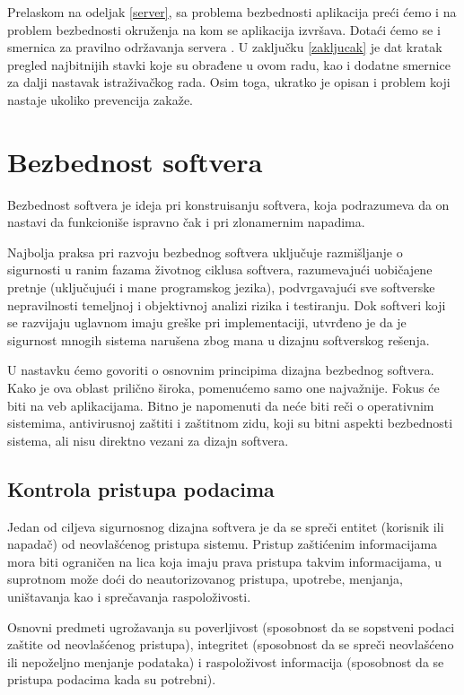 \documentclass[a4paper]{article}
\begin{document}
Prelaskom na odeljak \ref{server}, sa problema bezbednosti aplikacija preći ćemo i na problem bezbednosti okruženja na kom se aplikacija izvršava. Dotaći ćemo se i smernica za pravilno održavanja servera \cite{WS}. U zaklju\v{c}ku \ref{zakljucak} je dat kratak pregled najbitnijih stavki koje su obrađene u ovom radu, kao i dodatne smernice za dalji nastavak istraživačkog rada. Osim toga, ukratko je opisan i problem koji nastaje ukoliko prevencija zakaže.

\section{Bezbednost softvera} \label{bezbednost}

Bezbednost softvera je ideja pri konstruisanju softvera, koja podrazumeva da on nastavi da funkcioniše ispravno čak i pri zlonamernim napadima.

Najbolja praksa pri razvoju bezbednog softvera uključuje razmišljanje o sigurnosti u ranim fazama životnog ciklusa softvera, razumevajući uobičajene pretnje (uključujući i mane programskog jezika), podvrgavajući sve softverske nepravilnosti temeljnoj i objektivnoj analizi rizika i testiranju. Dok softveri koji se razvijaju uglavnom imaju greške pri implementaciji, utvrđeno je da je sigurnost mnogih sistema narušena zbog mana u dizajnu softverskog rešenja.

U nastavku ćemo govoriti o osnovnim principima dizajna bezbednog softvera. Kako je ova oblast prilično široka, pomenućemo samo one najvažnije. Fokus će biti na veb aplikacijama. Bitno je napomenuti da neće biti reči o operativnim sistemima, antivirusnoj zaštiti i zaštitnom zidu, koji su bitni aspekti bezbednosti sistema, ali nisu direktno vezani za dizajn softvera.

\subsection{Kontrola pristupa podacima}
Jedan od ciljeva sigurnosnog dizajna softvera je da se spreči entitet (korisnik ili napadač) od neovlašćenog pristupa sistemu. Pristup zaštićenim informacijama mora biti ograničen na lica koja imaju prava pristupa takvim informacijama, u suprotnom može doći do neautorizovanog pristupa, upotrebe, menjanja, uništavanja kao i sprečavanja raspoloživosti.

Osnovni predmeti ugrožavanja su poverljivost (sposobnost da se sopstveni podaci zaštite od neovlašćenog pristupa), integritet (sposobnost da se spreči neovlašćeno ili nepoželjno menjanje podataka) i raspoloživost informacija (sposobnost da se pristupa podacima kada su potrebni).\cite{BIS}
\end{document}
